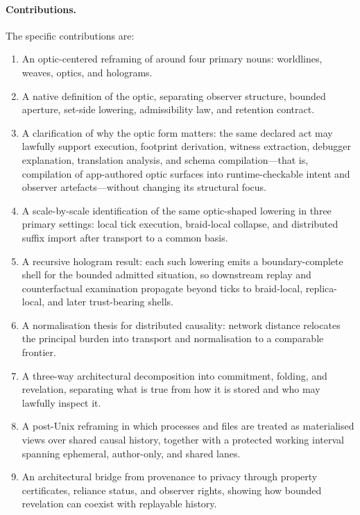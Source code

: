 \documentclass{aion}
\begin{document}
\paragraph{Contributions.}
The specific contributions are:

\begin{enumerate}[leftmargin=*]
	\item An optic-centered reframing of \WARP{} around four primary nouns: worldlines, weaves, optics, and holograms.

	\item A native definition of the \WARP{} optic, separating observer structure, bounded aperture, set-side lowering, admissibility law, and retention contract.

	\item A clarification of why the optic form matters: the same declared \WARP{} act may lawfully support execution, footprint derivation, witness extraction, debugger explanation, translation analysis, and schema compilation---that is, compilation of app-authored optic surfaces into runtime-checkable intent and observer artefacts---without changing its structural focus.

		\item A scale-by-scale identification of the same optic-shaped lowering in three primary settings: local tick execution, braid-local collapse, and distributed suffix import after transport to a common basis.

		\item A recursive hologram result: each such lowering emits a boundary-complete shell for the bounded admitted situation, so downstream replay and counterfactual examination propagate beyond ticks to braid-local, replica-local, and later trust-bearing shells.

		\item A normalisation thesis for distributed causality: network distance relocates the principal burden into transport and normalisation to a comparable frontier.

	\item A three-way architectural decomposition into commitment, folding, and revelation, separating what is true from how it is stored and who may lawfully inspect it.

	\item A post-Unix reframing in which processes and files are treated as materialised views over shared causal history, together with a protected working interval spanning ephemeral, author-only, and shared lanes.

	\item An architectural bridge from provenance to privacy through property certificates, reliance status, and observer rights, showing how bounded revelation can coexist with replayable history.
\end{enumerate}
\end{document}
